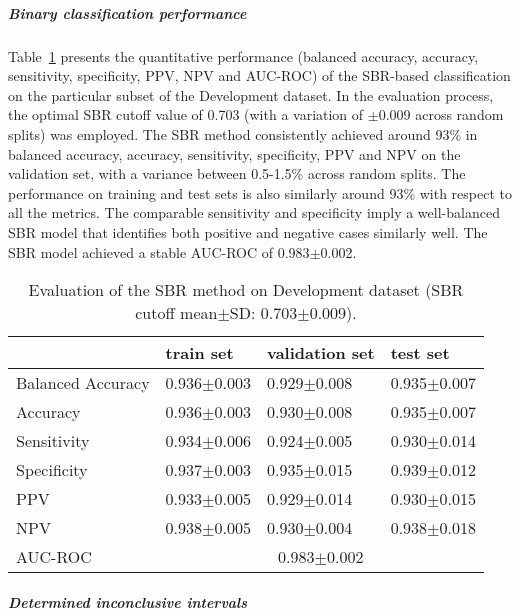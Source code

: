 \subparagraph{Binary classification performance}

Table~\ref{t1:sbr_perf_eval_table} presents the quantitative performance 
(balanced accuracy, accuracy, sensitivity, specificity, PPV, NPV and AUC-ROC) of the SBR-based classification on the 
particular subset of the Development dataset.
In the evaluation process, the optimal SBR cutoff value of 0.703 (with a variation of $\pm$0.009 across random splits) 
was employed.
The SBR method consistently achieved around 93\% in balanced accuracy, accuracy, sensitivity, specificity, PPV and NPV 
on the validation set, with a variance between 0.5-1.5\% across random splits.
The performance on training and test sets is also similarly around 93\% with respect to all the metrics.
The comparable sensitivity and specificity imply a well-balanced SBR model that 
identifies both positive and negative cases similarly well.
The SBR model achieved a stable AUC-ROC of 0.983$\pm$0.002.


\begin{table}[ht]
  \caption{Evaluation of the SBR method on Development dataset (SBR cutoff mean$\pm$SD: 0.703$\pm$0.009).}
  \centering
  \begin{tabular}{llll}
      \hline
                        & train set         & validation set      & test set             \\
      \hline
      Balanced Accuracy & 0.936$\pm$0.003   &   0.929$\pm$0.008   &  0.935$\pm$0.007     \\
      Accuracy          & 0.936$\pm$0.003   &   0.930$\pm$0.008   &  0.935$\pm$0.007     \\
      Sensitivity       &  0.934$\pm$0.006  &   0.924$\pm$0.005   &  0.930$\pm$0.014     \\
      Specificity       & 0.937$\pm$0.003   &   0.935$\pm$0.015   &  0.939$\pm$0.012     \\
      PPV               &  0.933$\pm$0.005  &   0.929$\pm$0.014   &  0.930$\pm$0.015     \\
      NPV               &  0.938$\pm$0.005  &   0.930$\pm$0.004   &  0.938$\pm$0.018     \\
      \hline
      AUC-ROC          &  \multicolumn{3}{c}{0.983$\pm$0.002 }  \\
      \hline
  \end{tabular}
 \label{t1:sbr_perf_eval_table}
\end{table}

\subparagraph{Determined inconclusive intervals}

